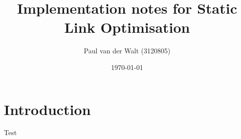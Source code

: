 \documentclass[a4paper]{article}
\author{Paul van der Walt (3120805)}
\date{\today}
\title{Implementation notes for Static Link Optimisation}
\begin{document}
\maketitle
\tableofcontents

\section{Introduction}

Test
\end{document}
